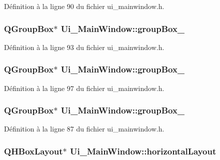 \-Définition à la ligne 90 du fichier ui\-\_\-mainwindow.\-h.

\hypertarget{class_ui___main_window_abb28acde35ffce4d0e6152579df2cbc3}{
\subsubsection[{group\-Box\-\_\-2}]{\setlength{\rightskip}{0pt plus 5cm}\-Q\-Group\-Box$\ast$ {\bf \-Ui\-\_\-\-Main\-Window\-::group\-Box\-\_}}}\label{class_ui___main_window_abb28acde35ffce4d0e6152579df2cbc3}


\-Définition à la ligne 93 du fichier ui\-\_\-mainwindow.\-h.

\hypertarget{class_ui___main_window_a320d3d7ba1cb8fff7b7b95923ed10f5e}{
\subsubsection[{group\-Box\-\_\-3}]{\setlength{\rightskip}{0pt plus 5cm}\-Q\-Group\-Box$\ast$ {\bf \-Ui\-\_\-\-Main\-Window\-::group\-Box\-\_}}}\label{class_ui___main_window_a320d3d7ba1cb8fff7b7b95923ed10f5e}


\-Définition à la ligne 97 du fichier ui\-\_\-mainwindow.\-h.

\hypertarget{class_ui___main_window_ad8a919e5634add9c41bfc319cb9fd338}{
\subsubsection[{group\-Box\-\_\-4}]{\setlength{\rightskip}{0pt plus 5cm}\-Q\-Group\-Box$\ast$ {\bf \-Ui\-\_\-\-Main\-Window\-::group\-Box\-\_}}}\label{class_ui___main_window_ad8a919e5634add9c41bfc319cb9fd338}


\-Définition à la ligne 87 du fichier ui\-\_\-mainwindow.\-h.

\hypertarget{class_ui___main_window_acd6fdc9ebacc4b25b834162380d75ce8}{
\subsubsection[{horizontal\-Layout}]{\setlength{\rightskip}{0pt plus 5cm}\-Q\-H\-Box\-Layout$\ast$ {\bf \-Ui\-\_\-\-Main\-Window\-::horizontal\-Layout}}}\label{class_ui___main_window_acd6fdc9ebacc4b25b834162380d75ce8}


